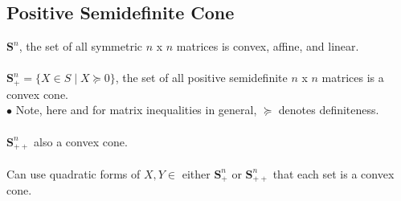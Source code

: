 \documentclass[]{article}
\begin{document}
\subsection*{Positive Semidefinite Cone}
$\boldsymbol{S}^{n}$, the set of all symmetric $n$ x $n$ matrices is convex, affine, and linear. \\\\
$\boldsymbol{S}^{n}_{+} = \{X \in S \mid X \succeq 0\}$, the set of all positive semidefinite $n$ x $n$ matrices is a convex cone. \\
$\bullet$ Note, here and for matrix inequalities in general, $\succeq$ denotes definiteness. \\\\
$\boldsymbol{S}^{n}_{++}$ also a convex cone. \\\\
Can use quadratic forms of $X,Y \in$ either $\boldsymbol{S}^{n}_{+}$ or $\boldsymbol{S}^{n}_{++}$ that each set is a convex cone. \\
\end{document}
